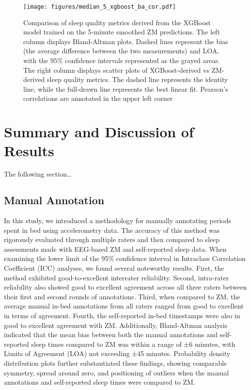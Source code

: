 \documentclass[
  10pt,
]{scrbook}
\begin{document}
\begin{figure}

{\centering \texttt{[image: figures/median\_5\_xgboost\_ba\_cor.pdf]}

}

\caption{\label{fig-xgb_ba_cor}Comparison of sleep quality metrics
derived from the XGBoost model trained on the 5-minute smoothed ZM
predictions. The left column displays Bland-Altman plots. Dashed lines
represent the bias (the average difference between the two measurements)
and LOA, with the 95\% confidence intervals represented as the grayed
areas. The right column displays scatter plots of XGBoost-derived vs
ZM-derived sleep quality metrics. The dashed line represents the
identity line, while the full-drawn line represents the best linear fit.
Pearson's correlations are annotated in the upper left corner}

\end{figure}

\hypertarget{summary-and-discussion-of-results}{%
\chapter{Summary and Discussion of
Results}\label{summary-and-discussion-of-results}}

The following section\ldots{}

\hypertarget{manual-annotation}{%
\section{Manual Annotation}\label{manual-annotation}}

In this study, we introduced a methodology for manually annotating
periods spent in bed using accelerometry data. The accuracy of this
method was rigorously evaluated through multiple raters and then
compared to sleep assessments made with EEG-based ZM and self-reported
sleep data. When examining the lower limit of the 95\% confidence
interval in Intraclass Correlation Coefficient (ICC) analyses, we found
several noteworthy results. First, the method exhibited
good-to-excellent interrater reliability. Second, intra-rater
reliability also showed good to excellent agreement across all three
raters between their first and second rounds of annotations. Third, when
compared to ZM, the average manual in-bed annotations from all raters
ranged from good to excellent in terms of agreement. Fourth, the
self-reported in-bed timestamps were also in good to excellent agreement
with ZM. Additionally, Bland-Altman analysis indicated that the mean
bias between both the manual annotations and self-reported sleep times
compared to ZM was within a range of ±6 minutes, with Limits of
Agreement (LOA) not exceeding ±45 minutes. Probability density
distribution plots further substantiated these findings, showing
comparable symmetry, spread around zero, and positioning of outliers
when the manual annotations and self-reported sleep times were compared
to ZM.
\end{document}
